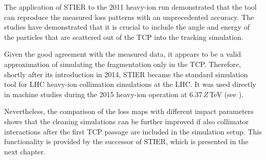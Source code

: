 The application of STIER to the 2011 heavy-ion run demonstrated that the tool can reproduce the measured loss patterns with an unprecedented accuracy. The studies have demonstrated that it is crucial to include the angle and energy of the particles that are scattered out of the TCP into the tracking simulation. 

Given the good agreement with the measured data, it appears to be a valid approximation of simulating the fragmentation only in the TCP. Therefore, shortly after its introduction in 2014, STIER became the standard simulation tool for LHC heavy-ion collimation simulations at the LHC. It was used directly in machine studies during the 2015 heavy-ion operation at 6.37$\,Z\,$TeV (see ). 

Nevertheless, the comparison of the loss maps with different impact parameters shows that the cleaning simulations can be further improved if also collimator interactions after the first TCP passage are included in the simulation setup. This functionality is provided by the successor of STIER, which is presented in the next chapter.